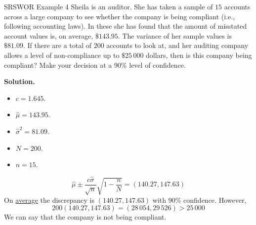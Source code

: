 \begin{Example}{SRSWOR Example 4}{}
    Sheila is an auditor.
    She has taken a sample of $15$ accounts across a large company
    to see whether the company is being compliant
    (i.e., following accounting laws). In these she has found that the
    amount of misstated account values is, on average, $\$143.95$.
    The variance of her sample values is $\$81.09$. If there are a total
    of $200$ accounts to look at, and her auditing company allows a level of
    non-compliance up to $\$25\,000$ dollars, then is this company being compliant?
    Make your decision at a 90\% level of confidence.

    \textbf{Solution.}
    \begin{itemize}
        \item $ c=1.645 $.
        \item $ \hat{\mu}=143.95 $.
        \item $ \hat{\sigma}^2=81.09 $.
        \item $ N=200 $.
        \item $ n=15 $.
    \end{itemize}
    \[ \hat{\mu}\pm \frac{c\hat{\sigma}}{\sqrt{n}}\sqrt{1-\frac{n}{N}}=(140.27,147.63) \]
    On \underline{average} the discrepancy is $(140.27,147.63)$ with $90\%$ confidence.
    However,
    \[ 200(140.27,147.63)=(28\,054,29\,526)>25\,000 \]
    We can say that the company is not being compliant.
\end{Example}
